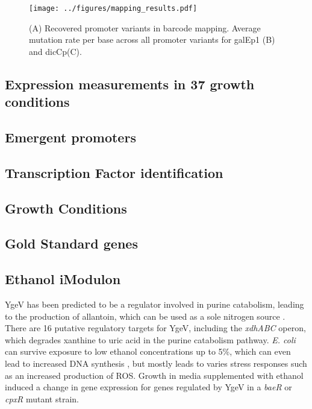 \begin{figure}
    \centering
    \texttt{[image: ../figures/mapping\_results.pdf]}
    \caption{(A) Recovered promoter variants in barcode mapping. Average mutation rate per base across all promoter variants for galEp1 (B) and dicCp(C). }
    \label{fig:mapping_results}
\end{figure}

\subsection{Expression measurements in 37 growth conditions}

\subsection{Emergent promoters}



\subsection{Transcription Factor identification}
\subsection{Growth Conditions}
\subsection{Gold Standard genes}
\subsection{Ethanol iModulon}
YgeV has been predicted to be a regulator involved in purine catabolism, leading to the production of allantoin, which can be used as a sole nitrogen source \cite{iwadate2019identification}. There are 16 putative regulatory targets \cite{lamoureux2021precise} for YgeV, including the \textit{xdhABC} operon, which degrades xanthine to uric acid \cite{iwadate2019identification} in the purine catabolism pathway. \textit{E. coli} can survive exposure to low ethanol concentrations up to 5\%, which can even lead to increased DNA synthesis \cite{basu1994effect}, but mostly leads to varies stress responses such as an increased production of ROS. Growth in media supplemented with ethanol induced a change in gene expression for genes regulated by YgeV in a \textDelta\textit{baeR} or \textDelta\textit{cpxR} mutant strain. 
